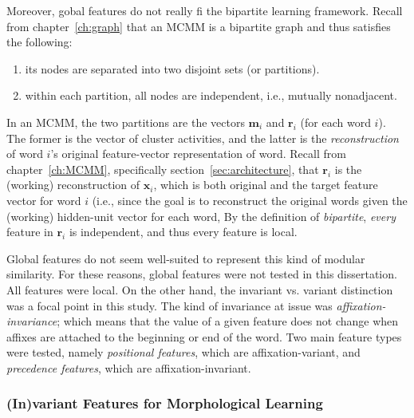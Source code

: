 Moreover, gobal features do not really fi the bipartite learning framework.
Recall from chapter~\ref{ch:graph} that an MCMM is a bipartite graph and thus 
satisfies the following:
\begin{enumerate}
\item its nodes are separated into two disjoint sets (or partitions).
\item within each partition, all nodes are independent, i.e., mutually 
nonadjacent.
\end{enumerate}
In an MCMM, the two partitions are the vectors $\textbf{m}_{i}$
and $\textbf{r}_{i}$ (for each word $i$). The former is the vector of 
cluster activities, and the latter
is the \emph{reconstruction} of word $i$'s original 
feature-vector representation of word. Recall from chapter~\ref{ch:MCMM}, 
specifically section~\ref{sec:architecture}, that $\textbf{r}_i$ is the (working)
reconstruction of $\textbf{x}_i$, which is both original and the target feature vector for word $i$ (i.e., since the goal is to reconstruct the original words given the (working) hidden-unit vector for each word,
By the definition of \emph{bipartite}, \emph{every} feature in $\textbf{r}_i$ is independent,
and thus every feature is local. 

Global features do not seem well-suited to represent this 
kind of modular similarity. For these reasons, global features were 
not tested in this dissertation. All features were local. 
On the other hand, the invariant vs. variant distinction 
was a focal point in this study.
The kind of invariance at issue was \emph{affixation-invariance}; 
which means that the value of a given feature does not change
when affixes are attached to the beginning or end of the word. 
Two main feature types were tested, namely 
\emph{positional features}, which are affixation-variant, 
and \emph{precedence features}, which are affixation-invariant.

\subsubsection{(In)variant Features for Morphological Learning}
\label{sec:invariant-features}
